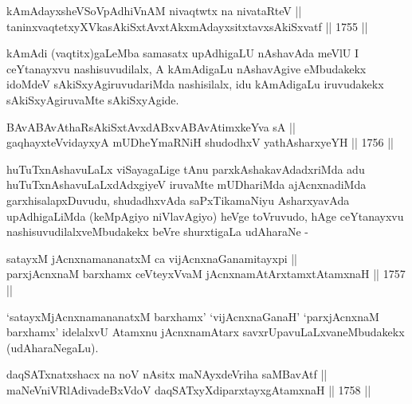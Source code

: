 
\begin{shl}
kAmAdayxsheVSoVpAdhiVnAM nivaqtwtx na nivataRteV || \\
taninxvaqtetxyXVkasAkiSxtAvxtAkxmAdayxsitxtavxsAkiSxvatf \hfill || 1755 ||  
\end{shl}

\begin{artha}
kAmAdi (vaqtitx)gaLeMba samasatx upAdhigaLU nAshavAda meVlU I
ceYtanayxvu nashisuvudilalx, A kAmAdigaLu nAshavAgive eMbudakekx
idoMdeV sAkiSxyAgiruvudariMda nashisilalx, idu kAmAdigaLu iruvudakekx
sAkiSxyAgiruvaMte sAkiSxyAgide.
\end{artha}


\begin{shl}
BAvABAvAthaRsAkiSxtAvxdABxvABAvAtimxkeYva sA ||  \\
gaqhayxteV\s vidayxyA mUDheYmaRNiH shudodhxV yathA\s \s sharxyeYH \hfill || 1756 ||  
\end{shl}

\begin{artha}
huTuTxnAshavuLaLx viSayagaLige tAnu parxkAshakavAdadxriMda adu
huTuTxnAshavuLaLxdAdxgiyeV iruvaMte mUDhariMda ajAcnxnadiMda
garxhisalapxDuvudu, shudadhxvAda saPxTikamaNiyu AsharxyavAda
upAdhigaLiMda (keMpAgiyo niVlavAgiyo) heVge toVruvudo, hAge
ceYtanayxvu nashisuvudilalxveMbudakekx beVre shurxtigaLa udAharaNe -
\end{artha}

\begin{shl}
satayxM jAcnxnamananatxM ca vijAcnxnaGanamitayxpi || \\
parxjAcnxnaM barxhamx ceVteyxVvaM jAcnxnamAtArxtamxtA\s \s tamxnaH \hfill || 1757 ||  
\end{shl}

\begin{artha}
`satayxMjAcnxnamananatxM barxhamx' `vijAcnxnaGanaH' `parxjAcnxnaM barxhamx' idelalxvU Atamxnu jAcnxnamAtarx
savxrUpavuLaLxvaneMbudakekx (udAharaNegaLu).
\end{artha}


\begin{shl}
daqSATxnatxshacx na noV nAsitx maNAyxdeVriha saMBavAtf || \\
maNeVniVRlAdivadeBxVdoV daqSATxyXdiparxtayxgAtamxnaH \hfill || 1758 ||  
\end{shl}

